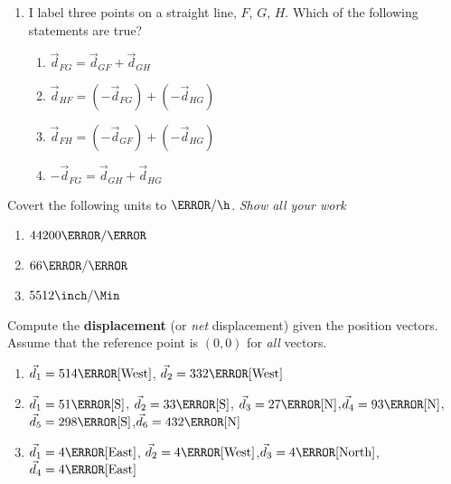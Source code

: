 \documentclass[12pt]{article} %
\newcommand{\tx}[1]{\text{#1}}
\begin{document}
\begin{qstn}[2]
\begin{enumerate}
		
		\item I label three points on a straight line, $F$, $G$, $H$. Which of the following statements are true?
			\begin{enumerate}[label = (\alph*)]
				\item $\vec d_{FG} = \vec d_{GF} + \vec d_{GH}$
				\item $\vec d_{HF} = (-\vec d_{FG}) + (-\vec d_{HG})$
				\item $\vec d_{FH} = (-\vec d_{GF}) + (-\vec d_{HG})$
				\item $-\vec d_{FG} = \vec d_{GH} + \vec d_{HG}$
			\end{enumerate}
	\end{enumerate}
	
\end{qstn}

\begin{qstn}[3]
Covert the following units to $\km / \h$. \emph{Show all your work}
\begin{enumerate}[label = (\alph*)]
	\item $44200 \m / \s$
	\vspace*{5cm}

	\item $66 \km / \s$
	\vspace*{5cm}

	\item $5512 \inch / \Min$
\end{enumerate}


\end{qstn}

\begin{qstn}[4]
	Compute the \textbf{displacement} (or \emph{net} displacement) given the position vectors. Assume that the reference point is $(0,0)$ for \emph{all} vectors.
    \begin{enumerate}[label=(\alph*)]
        \item $\vec d_1 = 514 \tx{\m}[\tx{West}]$, $\vec d_2 = 332 \tx{\m}[\tx{West}]$
         \vspace*{4cm}
        \item $\vec d_1 = 51 \tx{\m}[\tx{S}]$, $\vec d_2 = 33 \tx{\m}[\tx{S}]$, $\vec d_3 = 27 \tx{\m}[\tx{N}]$,$\vec d_4 = 93 \tx{\m}[\tx{N}]$,$\vec d_5 = 298 \tx{\m}[\tx{S}]$,$\vec d_6 = 432 \tx{\m}[\tx{N}]$
        \vspace*{4cm}
        \item $\vec d_1 = 4\tx{\m}[\tx{East}]$, $\vec d_2 = 4\tx{\m}[\tx{West}]$,$\vec d_3 = 4\tx{\m}[\tx{North}]$, $\vec d_4 = 4\tx{\m}[\tx{East}]$
		\vspace*{5cm}
    \end{enumerate}
\end{qstn}
\end{document}
